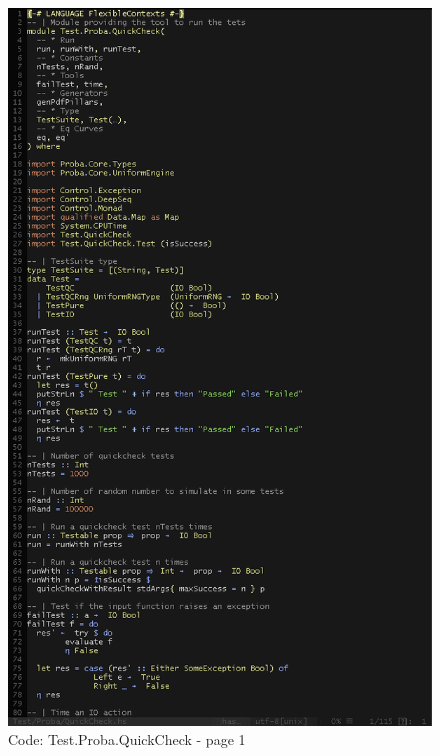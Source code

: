 \documentclass[12pt,a4paper,titlepage]{article}
\begin{document}
\begin{figure}[h!]
\centering
\includegraphics[width=1\textwidth]{img/code-test-quickcheck-1.png}
\caption{Code: Test.Proba.QuickCheck - page 1}
\label{fig:test.qc1}
\end{figure}
\end{document}
